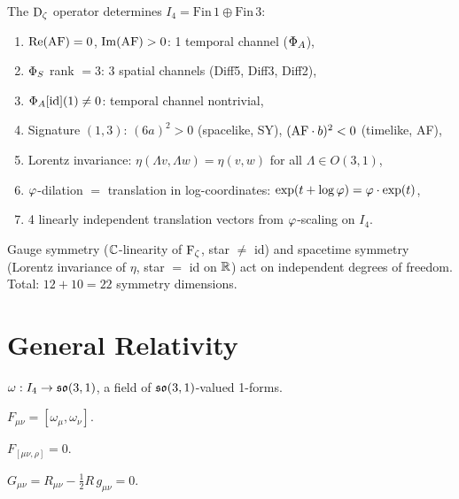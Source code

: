 \begin{theorem}
\label{thm:spacetime-uniqueness}
The $\operatorname{D_\zeta}$ operator determines $I_4 = \mathrm{Fin}\,1 \oplus \mathrm{Fin}\,3$:
\begin{enumerate}
  \item $\operatorname{Re}(\mathrm{AF}) = 0$, $\operatorname{Im}(\mathrm{AF}) > 0$: 1 temporal channel ($\Phi_A$),
  \item $\Phi_S$ rank $= 3$: 3 spatial channels (Diff5, Diff3, Diff2),
  \item $\Phi_A[\mathrm{id}](1) \ne 0$: temporal channel nontrivial,
  \item Signature $(1,3)$: $(6a)^2 > 0$ (spacelike, SY), $(\mathrm{AF} \cdot b)^2 < 0$ (timelike, AF),
  \item Lorentz invariance: $\eta(\Lambda v, \Lambda w) = \eta(v,w)$
    for all $\Lambda \in O(3,1)$,
  \item $\varphi$-dilation $=$ translation in log-coordinates:
    $\exp(t + \log\varphi) = \varphi \cdot \exp(t)$,
  \item 4 linearly independent translation vectors from $\varphi$-scaling on $I_4$.
\end{enumerate}
\end{theorem}

\begin{theorem}
\label{thm:gauge-spacetime-indep}
Gauge symmetry ($\mathbb{C}$-linearity of $\operatorname{F_\zeta}$, star $\ne$ id)
and spacetime symmetry (Lorentz invariance of $\eta$, star $=$ id on $\mathbb{R}$)
act on independent degrees of freedom.
Total: $12 + 10 = 22$ symmetry dimensions.
\end{theorem}

\section{General Relativity}

\begin{definition}
\label{def:lorentz-connection}
$\omega : I_4 \to \mathfrak{so}(3,1)$, a field of $\mathfrak{so}(3,1)$-valued 1-forms.
\end{definition}

\begin{definition}[Curvature]
\label{def:curvature}
$F_{\mu\nu} = [\omega_\mu, \omega_\nu]$.
\end{definition}

\begin{theorem}
\label{thm:bianchi}
$F_{[\mu\nu,\rho]} = 0$.
\end{theorem}

\begin{theorem}
\label{thm:vacuum-einstein}
$G_{\mu\nu} = R_{\mu\nu} - \tfrac{1}{2}R\,g_{\mu\nu} = 0$.
\end{theorem}
